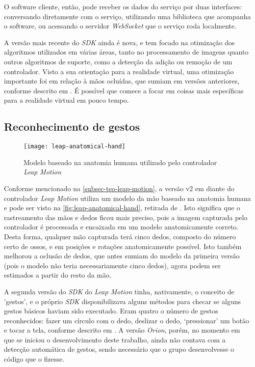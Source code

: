O software cliente, então, pode receber os dados do serviço por duas interfaces:
conversando diretamente com o serviço, utilizando uma biblioteca que acompanha o software, 
ou acessando o servidor \textit{WebSocket} que o serviço roda localmente.

A versão mais recente do \textit{SDK} ainda é nova, e tem focado na otimização dos 
algoritmos utilizados em várias áreas, tanto no processamento de imagens quanto 
outros algoritmos de suporte, como a detecção da adição ou remoção de um 
controlador. Visto a sua orientação para a realidade virtual, uma otimização 
importante foi em relação à mãos ocluídas, que sumiam em versões anteriores, 
conforme descrito em \cite{leap:2016:changeset}. É possível que comece a focar 
em coisas mais específicas para a realidade virtual em pouco tempo.

\subsection{Reconhecimento de gestos}\label{subsubsec-teo-gestos}

\begin{figure}[h]
	\centering
	\caption{Modelo baseado na anatomia humana utilizado pelo controlador \textit{Leap Motion}}
	\texttt{[image: leap-anatomical-hand]}
	\label{fig:leap-anatomical-hand}
\end{figure}

Conforme mencionado na \autoref{subsec-teo-leap-motion}, a versão 
v2 em diante do controlador \textit{Leap Motion} utiliza um modelo 
da mão baseado na anatomia humana e pode ser visto 
na \autoref{fig:leap-anatomical-hand}, retirada de \cite{leap:2016:intro-skeletal}. Isto significa que o 
rastreamento das mãos e dedos ficou mais preciso, pois a 
imagem capturada pelo controlador é processada e encaixada em 
um modelo anatomicamente correto. Desta forma, qualquer mão 
capturada terá cinco dedos, composto do número certo de ossos, e 
em posições e rotações anatomicamente possível. Isto também 
melhorou a oclusão de dedos, que antes sumiam do modelo da 
primeira versão (pois o modelo não teria necessariamente cinco dedos), 
agora podem ser estimados a partir do resto da mão.

A segunda versão do \textit{SDK} do \textit{Leap Motion} 
tinha, nativamente, o conceito de 'gestos', e o próprio 
\textit{SDK} disponibilizava alguns métodos para checar 
se alguns gestos básicos haviam sido executado. Eram quatro 
o número de gestos reconhecidos: fazer um círculo com o 
dedo, deslizar o dedo, `pressionar' um botão e tocar a 
tela, conforme descrito em \cite{leap:2016:gestures}. A 
versão \textit{Orion}, porém, no momento em que se 
iniciou o desenvolvimento deste trabalho, ainda não 
contava com a detecção automática de gestos, sendo 
necessário que o grupo desenvolvesse o código que o fizesse.

